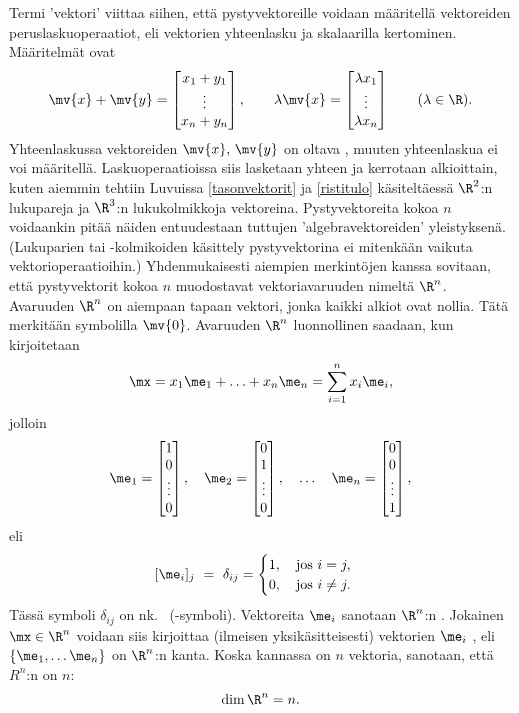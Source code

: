 Termi 'vektori' viittaa siihen, että pystyvektoreille voidaan määritellä vektoreiden 
peruslaskuoperaatiot, eli vektorien yhteenlasku ja skalaarilla kertominen. Määritelmät ovat
\[ 
\mv{x} + \mv{y} = \begin{bmatrix} x_1 + y_1 \\ \vdots \\ x_n + y_n \end{bmatrix}, \qquad
 \lambda \mv{x} = \begin{bmatrix} \lambda x_1 \\ \vdots \\ \lambda x_n \end{bmatrix} \qquad 
                                                                (\lambda \in \R).
\]
Yhteenlaskussa vektoreiden $\mv{x},\,\mv{y}$ on oltava  , muuten 
yhteenlaskua ei voi määritellä. Laskuoperaatioissa siis lasketaan yhteen ja kerrotaan 
alkioittain, kuten aiemmin tehtiin Luvuissa \ref{tasonvektorit} ja \ref{ristitulo} 
käsiteltäessä $\R^2$:n lukupareja ja $\R^3$:n lukukolmikkoja vektoreina. Pystyvektoreita kokoa
$n$ voidaankin pitää näiden entuudestaan tuttujen 'algebravektoreiden' yleistyksenä. (Lukuparien
tai \mbox{-kolmikoiden} käsittely pystyvektorina ei mitenkään vaikuta vektorioperaatioihin.)
Yhdenmukaisesti aiempien merkintöjen kanssa sovitaan, että pystyvektorit kokoa $n$ muodostavat
vektoriavaruuden nimeltä $\R^n$. Avaruuden $\R^n$
%
 on aiempaan tapaan vektori, jonka kaikki alkiot ovat nollia. Tätä merkitään
symbolilla $\mv{0}$. Avaruuden $\R^n$ luonnollinen
%
 saadaan, kun kirjoitetaan
\[ 
\mx = x_1 \me_1 + \ldots + x_n \me_n = \sum_{i=1}^n x_i \me_i, 
\]
jolloin
\[ 
\me_1 = \begin{bmatrix} 1 \\ 0 \\ \vdots \\ 0 \end{bmatrix}, \quad
\me_2 = \begin{bmatrix} 0 \\ 1 \\ \vdots \\ 0 \end{bmatrix}, \quad \ldots \quad
\me_n = \begin{bmatrix} 0 \\ 0 \\ \vdots \\ 1 \end{bmatrix}, 
\]
eli
\[ 
[\me_i]_j\ =\ \delta_{ij} 
           = \begin{cases} 1, \quad \text{jos}\ i=j, \\ 0, \quad \text{jos}\ i \neq j. 
             \end{cases} 
\]
Tässä symboli $\delta_{ij}$ on nk.\
%
 (-symboli). Vektoreita $\me_i$ sanotaan $\R^n$:n
\index{yksikkövektori}%
. Jokainen $\mx \in \R^n$ voidaan siis kirjoittaa 
(ilmeisen yksikäsitteisesti) vektorien $\me_i$
%
, eli $\{\me_1, \ldots \me_n\}$ on $\R^n$:n kanta. Koska kannassa on
$n$ vektoria, sanotaan, että $R^n$:n
%
 on $n$:
\[ 
\text{dim}\,\R^n = n. 
\]

